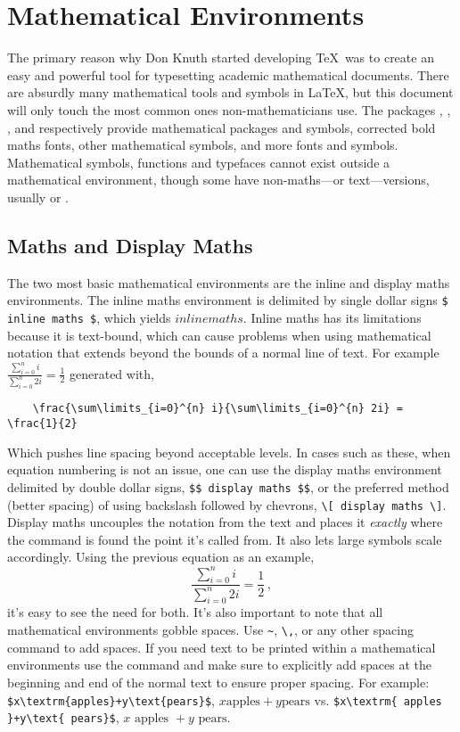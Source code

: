\chapter{Mathematical Environments}
%
The primary reason why Don Knuth started developing \TeX~was to create
an easy and powerful tool for typesetting academic mathematical
documents.  There are absurdly many mathematical tools and symbols in
\LaTeX, but this document will only touch the most common ones
non-mathematicians use.  The packages , ,
, and  respectively provide mathematical
packages and symbols, corrected bold maths fonts, other mathematical
symbols, and more fonts and symbols.  Mathematical symbols, functions
and typefaces cannot exist outside a mathematical environment, though
some have non-maths---or text---versions, usually
 or .
%
\section{Maths and Display Maths}
%
The two most basic mathematical environments are the inline and
display maths environments.  The inline maths environment is delimited
by single dollar signs \verb|$ inline maths $|, which yields
$ inline maths $.  Inline maths has its limitations because it is
text-bound, which can cause problems when using mathematical notation
that extends beyond the bounds of a normal line of text.  For example
$ \frac{\sum\limits_{i=0}^{n} i}{\sum\limits_{i=0}^{n} 2i} =
\frac{1}{2} $ generated with,
\begin{verbatim}
	\frac{\sum\limits_{i=0}^{n} i}{\sum\limits_{i=0}^{n} 2i} = \frac{1}{2}
\end{verbatim}
Which pushes line spacing beyond acceptable levels.  In cases such as
these, when equation numbering is not an issue, one can use the
display maths environment delimited by double dollar signs,
\verb|$$ display maths $$|, or the preferred method (better spacing)
of using backslash followed by chevrons, \verb|\[ display maths \]|.
Display maths uncouples the notation from the text and places it
\emph{exactly} where the command is found the point it's called
from.  It also lets large symbols scale accordingly.  Using the previous
equation as an example,
\[ \frac{\sum\limits_{i=0}^{n} i}{\sum\limits_{i=0}^{n} 2i} =
  \frac{1}{2}\,, \]
it's easy to see the need for both.  It's also important to note that
all mathematical environments gobble spaces.  Use \verb|~|, \verb|\,|,
or any other spacing command to add spaces.  If you need text to be
printed within a mathematical environments use the 
command and make sure to explicitly add spaces at the beginning and
end of the normal text to ensure proper spacing.  For example:
\verb|$x\textrm{apples}+y\text{pears}$|,
$x\textrm{apples}+y\text{pears}$ vs.
\verb|$x\textrm{ apples }+y\text{ pears}$|,
$x\textrm{ apples }+y\text{ pears}$.
%
